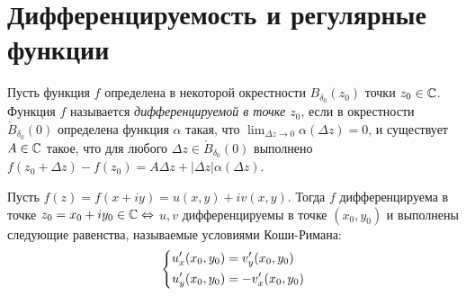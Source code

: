 \section{Дифференцируемость и регулярные функции}

\begin{definition}
	Пусть функция $f$ определена в некоторой окрестности $B_{\delta_0}(z_0)$ точки  $z_0 \in \mathbb{C}$. Функция $f$ называется \textit{дифференцируемой в точке $z_0$}, если в окрестности $\mathring B_{\delta_0}{(0)}$ определена функция $\alpha$ такая, что $\lim_{\Delta z \to 0}\alpha(\Delta z) = 0$, и существует $A \in \mathbb{C}$ такое, что для любого $\Delta z \in \mathring B_{\delta_0}{(0)}$ выполнено $f(z_0 + \Delta z) - f(z_0) = A\Delta z + |\Delta z|\alpha(\Delta z)$.
\end{definition}

\begin{theorem}
	Пусть $f(z) = f(x + iy) = u(x, y) + iv(x, y)$. Тогда $f$ дифференцируема в точке $z_0 = x_0 + iy_0 \in \mathbb{C} \Leftrightarrow$ $u, v$ дифференцируемы в точке $(x_0, y_0)$ и выполнены следующие равенства, называемые условиями Коши-Римана:
	\[\left\{\begin{aligned}u'_x(x_0, y_0) &= v'_y(x_0, y_0) \\ u'_y(x_0, y_0) &= -v'_x(x_0, y_0)\end{aligned}\right.\]
\end{theorem}

